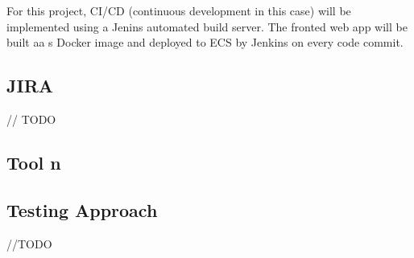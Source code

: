 	For this project, CI/CD (continuous development in this case) will be implemented using a Jenins automated build server. The fronted web app will be built aa s Docker image and deployed to ECS by Jenkins on every code commit. 
	
	\subsection{JIRA}
	// TODO
	\subsection{Tool n}
	\subsection{Testing Approach}
	//TODO
